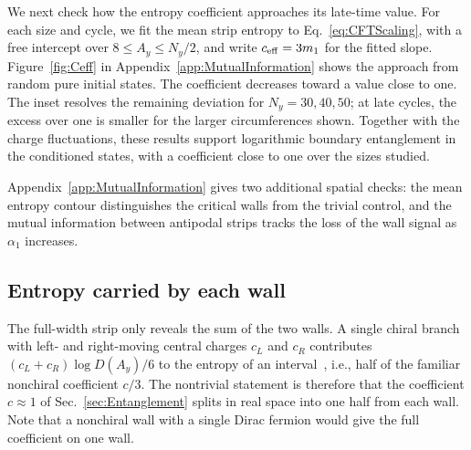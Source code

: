 \documentclass[aps,prb,10pt,twocolumn,superscriptaddress,longbibliography,floatfix]{revtex4-2}
\newcommand{\newtext}[1]{{\color{blue}#1}}
\newcommand{\claudeadd}[1]{{\color{orange}#1}}
\begin{document}
{\color{blue}
We next check how the entropy coefficient approaches its late-time value. For each size and cycle, we fit the mean strip entropy to Eq.~\eqref{eq:CFTScaling}, with a free intercept over $8\leq A_y\leq N_y/2$, and write $c_{\rm eff}=3m_1$ for the fitted slope. Figure~\ref{fig:Ceff} in Appendix~\ref{app:MutualInformation} shows the approach from random pure initial states. The coefficient decreases toward a value close to one. The inset resolves the remaining deviation for $N_y=30,40,50$; at late cycles, the excess over one is smaller for the larger circumferences shown. \claudeadd{Together with the charge fluctuations, these results support logarithmic boundary entanglement in the conditioned states, with a coefficient close to one over the sizes studied.}
}



{\color{blue}
Appendix~\ref{app:MutualInformation} gives two additional spatial checks: the mean entropy contour distinguishes the critical walls from the trivial control, and the mutual information between antipodal strips tracks the loss of the wall signal as $\alpha_1$ increases.
}

{\color{blue}\subsection{Entropy carried by each wall}
\label{sec:ChiralCentralCharge}}

The full-width strip only reveals the sum of the two walls. A single chiral branch with left- and right-moving central charges $c_L$ and $c_R$ contributes \newtext{$(c_L+c_R)\log D(A_y)/6$} to the entropy of an interval~\cite{CalabreseCardy2004,CastroDetournayIqbalPerlmutter2014}, i.e., half of the familiar nonchiral coefficient $c/3$. The nontrivial statement is therefore that the coefficient $c\approx1$ of Sec.~\ref{sec:Entanglement} splits in real space into one half from each wall. Note that a nonchiral wall with a single Dirac fermion would give the full coefficient on one wall.
\end{document}
